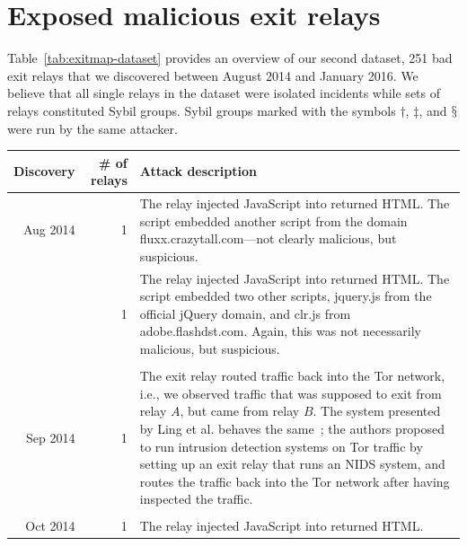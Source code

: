 \appendix

\section{Exposed malicious exit relays}
\label{sec:malicious-relays}
Table~\ref{tab:exitmap-dataset} provides an overview of our second dataset, 251
bad exit relays that we discovered between August 2014 and January 2016.  We
believe that all single relays in the dataset were isolated incidents while sets
of relays constituted Sybil groups.  Sybil groups marked with the symbols
$\dagger$, $\ddagger$, and $\mathsection$ were run by the same attacker.

\begin{table}
\small
\centering
\begin{tabularx}{\textwidth}{r r X}
\toprule
\textbf{Discovery} & \textbf{\# of relays} & \textbf{Attack description} \\
\midrule
Aug 2014 & 1 & The relay injected JavaScript into returned HTML.  The script
embedded another script from the domain fluxx.crazytall.com---not clearly
malicious, but suspicious. \\

& 1 & The relay injected JavaScript into returned HTML.  The script
embedded two other scripts, jquery.js from the official jQuery domain, and
clr.js from adobe.flashdst.com.  Again, this was not necessarily malicious, but
suspicious. \\

& & \\

Sep 2014 & 1 & The exit relay routed traffic back into the Tor network, i.e., we
observed traffic that was supposed to exit from relay $A$, but came from relay
$B$.  The system presented by Ling et al. behaves the same~\cite{Ling2015a};
the authors proposed to run intrusion detection systems on Tor traffic by
setting up an exit relay that runs an NIDS system, and routes the traffic back
into the Tor network after having inspected the traffic. \\

& & \\

Oct 2014 & 1 & The relay injected JavaScript into returned HTML. \\


\end{tabularx}
\end{table}
